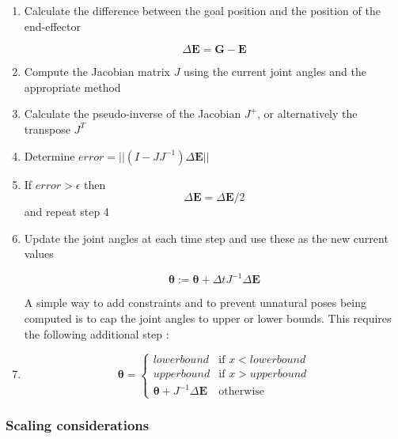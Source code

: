 \documentclass[paper=a4, fontsize=11pt]{scrartcl} %
\numberwithin{equation}{section} %
\numberwithin{figure}{section} %
\numberwithin{table}{section} %
\newcommand{\vect}[1]{\mathbf{#1}}
\newcommand{\params}{\boldsymbol{\theta}}
\begin{document}
\begin{enumerate}
\item
Calculate the difference between the goal position and the position of the end-effector

\begin{equation}
\Delta \vect{E} = \vect{G} - \vect{E}
\end{equation}

\item
Compute the Jacobian matrix $J$ using the current joint angles and the appropriate method

\item
Calculate the pseudo-inverse of the Jacobian $J^+$, or alternatively the transpose $J^T$

\item
Determine $error = ||(I - JJ^{-1})\Delta \vect{E}||$

\item
If $error > \epsilon$ then
\vspace{1mm}
\begin{equation}
\Delta \vect{E} = \Delta \vect{E} / 2
\end{equation}  
\vspace{1mm}
and repeat step 4

\item
Update the joint angles at each time step and use these as the new current values

\begin{equation}
\params := \params + \Delta t J^{-1} \Delta \vect{E}
\end{equation}

A simple way to add constraints and to prevent unnatural poses being computed is to cap the joint angles to upper or lower bounds. This requires the following additional step \cite{Madd04}:

\item
\begin{equation}
\params = \left\{
\begin{array}{rl}
lowerbound & \text{if } x < lowerbound\\
upperbound & \text{if } x > upperbound\\
\params + J^{-1}\Delta \vect{E} & \text{otherwise}
\end{array} \right.
\label{eq:constraint}
\end{equation}

\end{enumerate}

\subsubsection{Scaling considerations}
\end{document}
